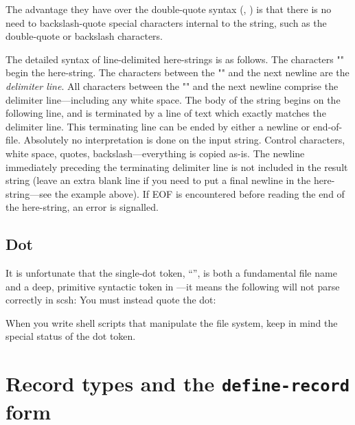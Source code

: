 The advantage they have over the double-quote syntax 
(\eg, )
is that there is no need to backslash-quote special characters internal
to the string, such as the double-quote or backslash characters.

The detailed syntax of line-delimited here-strings is as follows.
The characters "\ex{\#<<}" begin the here-string.  
The characters between the "\ex{\#<<}" and the next newline are the
\emph{delimiter line}. 
All characters between the "\ex{\#<<}" and the next newline comprise the
delimiter line---including any white space. 
The body of the string begins on the following line,
and is terminated by a line of text which exactly matches the
delimiter line.  
This terminating line can be ended by either a newline or end-of-file.
Absolutely no interpretation is done on the input string.  
Control characters, white space, quotes, backslash---everything
is copied as-is.  
The newline immediately preceding the terminating delimiter line is
not included in the result string
(leave an extra blank line if you need to put a final
newline in the here-string---see the example above).  
If EOF is encountered before reading the end of the here-string, 
an error is signalled.

\subsection{Dot}
It is unfortunate that the single-dot token, ``'', is both
a fundamental {\Unix} file name and a deep, primitive syntactic token
in {\Scheme}---it means the following will not parse correctly in scsh:
You must instead quote the dot: 

When you write shell scripts that manipulate the file system,
keep in mind the special status of the dot token.

\section{Record types and the \texttt{define-record} form}
\label{sec:defrec}

